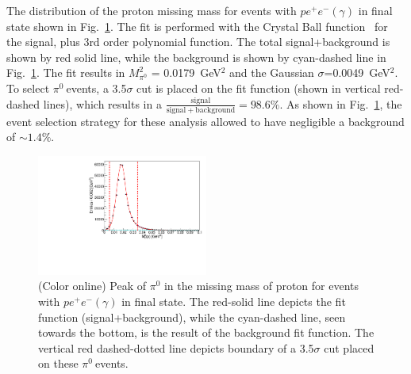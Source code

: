 \documentclass[aps,prc,twocolumn,floatfix,showpacs,preprintnumbers,amsmath,amssymb,superscriptaddress]{revtex4-1}
\def\pizT{$\pi^{0} \ $}
\begin{document}
The distribution of the proton missing mass for events
with $pe^+e^-(\gamma)$ in final state shown in 
Fig.~\ref{fig:pi0_peak}. 
The fit is performed with the Crystal Ball function~\cite{Ball1,Ball2} for the signal, plus 3rd 
order polynomial function. The total signal+background is shown by red solid line, while the background is shown by cyan-dashed line in Fig.~\ref{fig:pi0_peak}. The fit results in $M_{\pi^0}^2$ = 
0.0179~GeV$^2$ and the Gaussian $\sigma$=0.0049~GeV$^2$. To select \pizT events, a 3.5$\sigma$ cut is placed on the fit function (shown in vertical red-dashed lines), which results in a $\frac{\mathrm{signal}}{\mathrm{signal + background}} = 98.6\%$. As shown in Fig.~\ref{fig:pi0_peak}, the event selection strategy for these analysis allowed to have negligible a background of $\sim1.4\%$.
\begin{figure}[htb!]
\centerline{
        \includegraphics[height=0.4\textwidth,width=0.5\textwidth]{G12_Pi0_thesis.pdf}}

        \caption {(Color online) Peak of $\pi^0$ in the missing
                mass of proton for events with $pe^+e^-(\gamma)$
                in final state. The red-solid line depicts the fit function (signal+background), while the cyan-dashed line, seen towards the bottom, is the result of the background fit function. The vertical red dashed-dotted line depicts boundary of a 3.5$\sigma$ cut placed on these \pizT events.} \label{fig:pi0_peak}
\end{figure}
\end{document}
